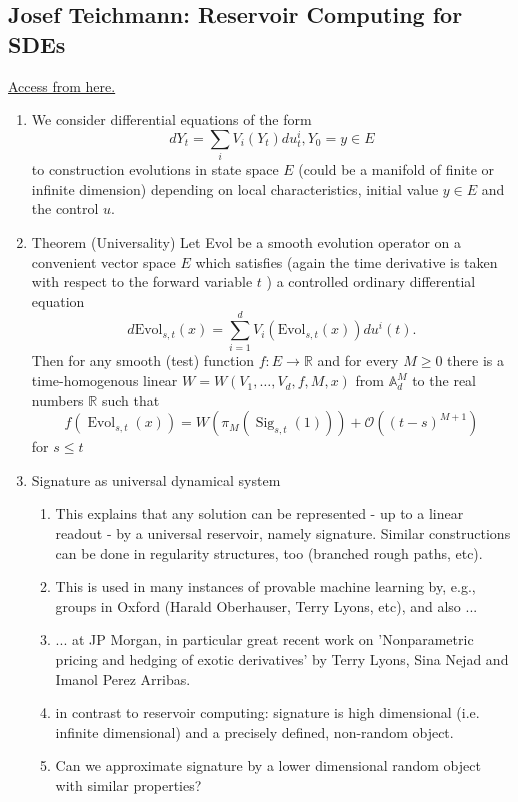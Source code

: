 \subsection{Josef Teichmann: Reservoir Computing for SDEs}
\href{https://www.youtube.com/watch?v=AhxROWo_FOw}{Access from here.}
\begin{enumerate}
    \item We consider differential equations of the form
    $$
    d Y_t=\sum_i V_i\left(Y_t\right) d u_t^i, Y_0=y \in E
    $$
    to construction evolutions in state space $E$ (could be a manifold of finite or infinite dimension) depending on local characteristics, initial value $y \in E$ and the control $u$.
    \item Theorem (Universality)
    Let Evol be a smooth evolution operator on a convenient vector space $E$ which satisfies (again the time derivative is taken with respect to the forward variable $t$ ) a controlled ordinary differential equation
    $$
    d \mathrm{Evol}_{s, t}(x)=\sum_{i=1}^d V_i\left(\mathrm{Evol}_{s, t}(x)\right) d u^i(t) .
    $$
    Then for any smooth (test) function $f: E \rightarrow \mathbb{R}$ and for every $M \geq 0$ there is a time-homogenous linear $W=W\left(V_1, \ldots, V_d, f, M, x\right)$ from $\mathbb{A}_d^M$ to the real numbers $\mathbb{R}$ such that
    $$
    f\left(\operatorname{Evol}_{s, t}(x)\right)=W\left(\pi_M\left(\operatorname{Sig}_{s, t}(1)\right)\right)+\mathcal{O}\left((t-s)^{M+1}\right)
    $$
    for $s \leq t$
    \item Signature as universal dynamical system \begin{enumerate}
        \item This explains that any solution can be represented - up to a linear readout - by a universal reservoir, namely signature. Similar constructions can be done in regularity structures, too (branched rough paths, etc).
        \item This is used in many instances of provable machine learning by, e.g., groups in Oxford (Harald Oberhauser, Terry Lyons, etc), and also ...
        \item ... at JP Morgan, in particular great recent work on 'Nonparametric pricing and hedging of exotic derivatives' by Terry Lyons, Sina Nejad and Imanol Perez Arribas.
        \item in contrast to reservoir computing: signature is high dimensional (i.e. infinite dimensional) and a precisely defined, non-random object.
        \item Can we approximate signature by a lower dimensional random object with similar properties?
    \end{enumerate}
\end{enumerate}

\clearpage